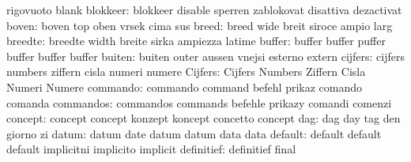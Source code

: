                            rigovuoto                 blank
                 blokkeer: blokkeer                  disable
                           sperren                   zablokovat
                           disattiva                 dezactivat
                    boven: boven                     top
                           oben                      vrsek
                           cima                      sus
                    breed: breed                     wide
                           breit                     siroce
                           ampio                     larg
                  breedte: breedte                   width
                           breite                    sirka
                           ampiezza                  latime
                   buffer: buffer                    buffer
                           puffer                    buffer
                           buffer                    buffer
                   buiten: buiten                    outer
                           aussen                    vnejsi
                           esterno                   extern
                  cijfers: cijfers                   numbers
                           ziffern                   cisla
                           numeri                    numere
                  Cijfers: Cijfers                   Numbers
                           Ziffern                   Cisla
                           Numeri                    Numere
                 commando: commando                  command
                           befehl                    prikaz
                           comando                   comanda
                commandos: commandos                 commands
                           befehle                   prikazy
                           comandi                   comenzi
                  concept: concept                   concept
                           konzept                   koncept
                           concetto                  concept
                      dag: dag                       day
                           tag                       den
                           giorno                    zi
                    datum: datum                     date
                           datum                     datum
                           data                      data
                  default: default                   default
                           default                   implicitni
                           implicito                 implicit
               definitief: definitief                final
